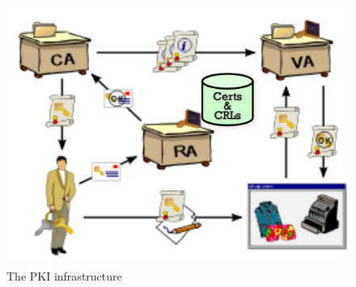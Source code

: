     \begin{figure}[h!]
        \centering
        \includegraphics[scale=0.3]{images/PKI.png}
        \caption{The PKI infrastructure}
        \label{fig:pki}
    \end{figure}
    
    \FloatBarrier
    